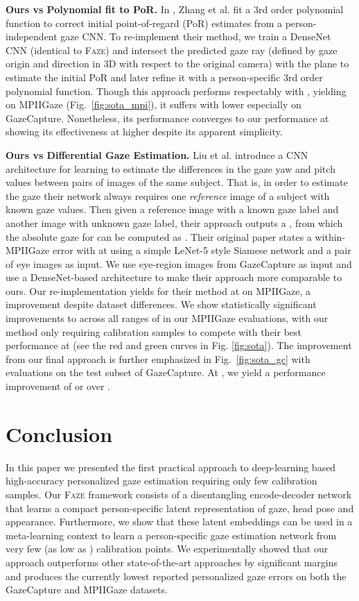 \documentclass[10pt,twocolumn,letterpaper]{article}
\newcommand{\faze}[0]{\textsc{Faze}\xspace}
\newcommand{\Paragraph}[1]
{\vspace{1.5mm} \noindent \textbf{#1}}
\begin{document}
\Paragraph{Ours vs Polynomial fit to PoR.} In \cite{Zhang2019CHI}, Zhang et al. fit a 3rd order polynomial function to correct initial point-of-regard (PoR) 
estimates from a person-independent gaze CNN.
To re-implement their method, we train a DenseNet CNN (identical to \faze) and intersect the predicted gaze ray (defined by gaze origin and direction in 3D with respect to the original camera) with the  plane to estimate the initial PoR and later refine it with a person-specific 3rd order polynomial function.
Though this approach performs respectably with , yielding  on MPIIGaze (Fig.~\ref{fig:sota_mpi}), it suffers with lower  especially on GazeCapture.
Nonetheless, its performance converges to our performance at  showing its effectiveness at higher  despite its apparent simplicity.

\Paragraph{Ours vs Differential Gaze Estimation.}
Liu et al. \cite{Liu2018BMVC} introduce a CNN architecture for learning to estimate the differences in the gaze yaw and pitch values between pairs of images of the same subject.
That is, in order to estimate the gaze their network always requires one \emph{reference} image of a subject with known gaze values. Then given a reference image  with a known gaze label  and another image  with unknown gaze label, their approach outputs a , from which the absolute gaze for  can be computed as .
Their original paper states a within-MPIIGaze error with  at  using a simple LeNet-5 style Siamese network and a pair of eye images as input.
We use  eye-region images from GazeCapture as input and use a DenseNet-based architecture to make their approach more comparable to ours.
Our re-implementation yields  for their method at  on MPIIGaze, a  improvement despite dataset differences.
We show statistically significant improvements to \cite{Liu2018BMVC} across all ranges of  in our MPIIGaze evaluations, with our method only requiring  calibration samples to compete with their best performance at  (see the red and green curves in Fig. \ref{fig:sota}).
The improvement from our final approach is further emphasized in Fig.~\ref{fig:sota_gc} with evaluations on the test subset of GazeCapture.
At , we yield a performance improvement of  or  over \cite{Liu2018BMVC}.
 
\section{Conclusion}
In this paper we presented the first practical approach to deep-learning based high-accuracy personalized gaze estimation requiring only few calibration samples. Our \faze framework consists of a disentangling encode-decoder network that learns a compact person-specific latent representation of gaze, head pose and appearance. Furthermore, we show that these latent embeddings can be used in a meta-learning context to learn a person-specific gaze estimation network from very few (as low as ) calibration points. We experimentally showed that our approach outperforms other state-of-the-art approaches by significant margins and produces the currently lowest reported personalized gaze errors on both the GazeCapture and MPIIGaze datasets.
\end{document}
